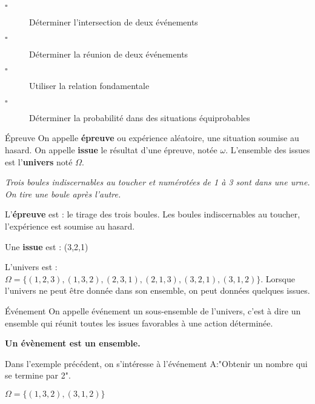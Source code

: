 \begin{titre}[Probabilités]

\end{titre}

\begin{CpsCol}
\begin{description}
\item[$\square$] Déterminer l'intersection de deux événements
\item[$\square$] Déterminer la réunion de deux événements
\item[$\square$] Utiliser la relation fondamentale
\item[$\square$] Déterminer la probabilité dans des situations équiprobables
\end{description}
\end{CpsCol}


\begin{DefT}{Épreuve}
On appelle \textbf{épreuve} ou expérience aléatoire, une situation soumise au hasard.
On appelle \textbf{issue} le résultat d'une épreuve, notée $\omega$. L'ensemble des issues est l'\textbf{univers} noté $\Omega$. 
\end{DefT}

\begin{Ex}
\textit{Trois boules indiscernables au toucher et numérotées de 1 à 3 sont dans une urne. On tire une boule après l'autre.}

L'\textbf{épreuve} est : le tirage des trois boules. Les boules indiscernables au toucher, l'expérience est soumise au hasard.

Une \textbf{issue} est : (3,2,1)

L'univers est : $\Omega = \lbrace (1,2,3),(1,3,2),(2,3,1),(2,1,3),(3,2,1),(3,1,2)\rbrace$. Lorsque l'univers ne peut être donnée dans son ensemble, on peut données quelques issues.

\end{Ex}


\begin{DefT}{Événement}
On appelle événement un sous-ensemble de l'univers, c'est à dire un ensemble qui réunit toutes les issues favorables à une action déterminée.

\textbf{Un évènement est un ensemble.}
\end{DefT}


\begin{Ex}

Dans l'exemple précédent, on s'intéresse à l'événement A:"Obtenir un nombre qui se termine par 2".

$\Omega = \lbrace (1,3,2),(3,1,2)\rbrace$
\end{Ex}

